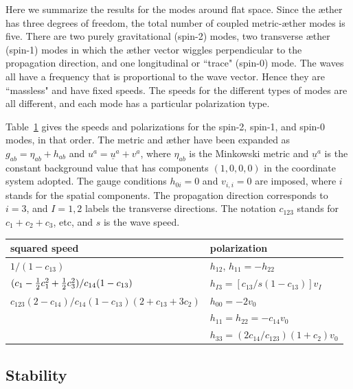 \documentclass[aps]{ws-procs9x6}
\def\uu{\underline{u}}
\begin{document}
Here we summarize the results for the modes around flat space.
Since the {\ae}ther has three degrees of freedom, the total
number of coupled metric-{\ae}ther modes is five. There are two
purely gravitational (spin-2) modes, two transverse {\ae}ther
(spin-1) modes in which the {\ae}ther vector wiggles perpendicular
to the propagation direction, and one longitudinal or ``trace"
(spin-0) mode. The waves all have a frequency that is
proportional to the wave vector. Hence they are ``massless" and
have fixed speeds. The speeds for the different types of modes
are all different, and each mode has a particular polarization
type.

Table~\ref{table:waves} gives the speeds and polarizations for
the spin-2, spin-1, and spin-0 modes, in that order. The metric
and {\ae}ther have been expanded as $g_{ab}=\eta_{ab}+h_{ab}$ and
$u^a=\uu^a + v^a$, where $\eta_{ab}$ is the Minkowski metric and
$\uu^a$ is the constant background value that has components
$(1,0,0,0)$ in the coordinate system adopted. The gauge
conditions $h_{0i}=0$ and $v_{i,i}=0$ are imposed, where $i$
stands for the spatial components. The propagation direction
corresponds to $i=3$, and $I=1,2$ labels the transverse
directions. The notation $c_{123}$ stands for $c_1+c_2+c_3$, etc, and $s$
is the wave speed.
\begin{table}[h]
{\begin{tabular}{@{}ll@{}}
\hline
squared speed & polarization\\
\hline
$1/(1-c_{13})$ & $h_{12}$, $h_{11}=-h_{22}$\\[1ex]
\vspace{2mm}$(c_1-\textstyle{\frac{1}{2}} c_1^2+\textstyle{\frac{1}{2}}
c_3^2)/c_{14}(1-c_{13})$ &
$h_{I3}=[c_{13}/s(1-c_{13})]v_I $\\[1ex]
$c_{123}(2-c_{14})/c_{14}(1-c_{13})(2+c_{13}+3c_2)$
& $h_{00}=-2v_0$\\
& $h_{11}=h_{22}=-c_{14}v_0$\\
& $h_{33}=(2c_{14}/c_{123})(1+c_2)v_0$\\
\hline
\end{tabular}\label{table:waves} }
\end{table}
%

\subsection{Stability}
\end{document}

